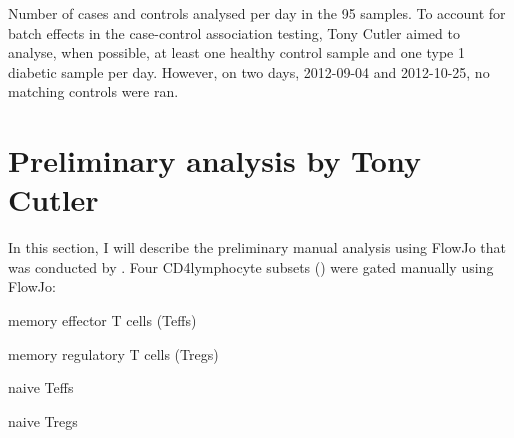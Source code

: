 { Number of cases and controls analysed per day in the 95 samples. }
{
  To account for batch effects in the case-control association testing,
  Tony Cutler aimed to analyse, when possible,
  at least one healthy control sample and one type 1 diabetic sample per day.
  However, on two days, 2012-09-04 and 2012-10-25, no matching controls were ran.
}

\clearpage

\section{Preliminary analysis by Tony Cutler}

In this section, I will describe the preliminary manual analysis using FlowJo that was conducted by .
Four CD4\positive lymphocyte subsets () were gated manually using FlowJo:
\begin{itemise}
    \item memory effector T cells (Teffs)
    \item memory regulatory T cells (Tregs)
    \item naive Teffs
    \item naive Tregs
\end{itemise}


